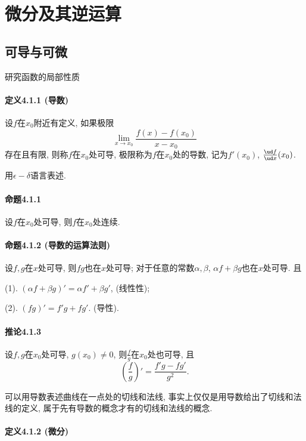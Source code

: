
\section{微分及其逆运算}

\subsection{可导与可微}

研究函数的局部性质

\paragraph{定义4.1.1 (导数)}

设$f$在$x_{0}$附近有定义, 如果极限
\[
\lim_{x\to x_{0}}\frac{f(x)-f(x_{0})}{x-x_{0}}
\]
存在且有限, 则称$f$在$x_{0}$处可导, 极限称为$f$在$x_{0}$处的导数, 记为$f'(x_{0})$,
$\frac{\ud f}{\ud x}(x_{0})$.

用$\epsilon-\delta$语言表述.

\paragraph{命题4.1.1}

设$f$在$x_{0}$处可导, 则$f$在$x_{0}$处连续.

\paragraph{命题4.1.2 (导数的运算法则)}

设$f,g$在$x$处可导, 则$fg$也在$x$处可导; 对于任意的常数$\alpha,\beta$, $\alpha f+\beta g$也在$x$处可导.
且

(1). $(\alpha f+\beta g)'=\alpha f'+\beta g'$, (线性性);

(2). $(fg)'=f'g+fg'$. (导性).

\paragraph{推论4.1.3}

设$f,g$在$x_{0}$处可导, $g(x_{0})\ne0$, 则$\frac{f}{g}$在$x_{0}$处也可导,
且
\[
\left(\frac{f}{g}\right)'=\frac{f'g-fg'}{g^{2}}.
\]

可以用导数表述曲线在一点处的切线和法线, 事实上仅仅是用导数给出了切线和法线的定义, 属于先有导数的概念才有的切线和法线的概念.

\paragraph{定义4.1.2 (微分)}


